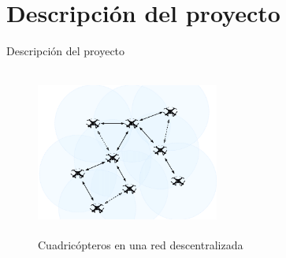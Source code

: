 \documentclass[
	11pt, %
]{beamer}
\begin{document}
\section{Descripción del proyecto}
\begin{frame}{Descripción del proyecto}
  
  \begin{figure}
    \centering
    \includegraphics[width=6cm, height=5.5cm]{multiuab}
    \caption[Caption for LOF]{Cuadric\'{o}pteros en una red descentralizada\protect\footnotemark}
  \end{figure}
    
      
\end{frame}
\end{document}
